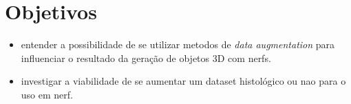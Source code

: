 \section{Objetivos}

\begin{itemize}
  \item entender a possibilidade de se utilizar metodos de \textit{data augmentation} para influenciar o resultado da geração de objetos 3D com nerfs.
  \item investigar a viabilidade de se aumentar um dataset histológico ou nao para o uso em nerf.
\end{itemize}



%
%    
%
